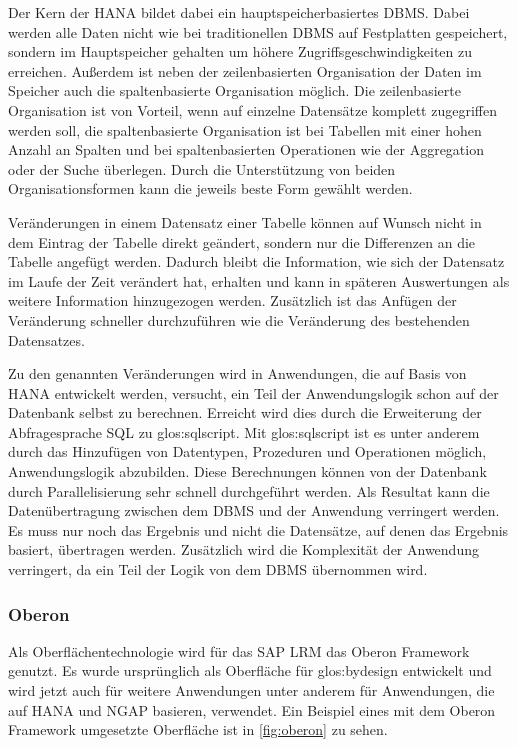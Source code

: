 \begin{onehalfspacing}
Der Kern der \gls{HANA} bildet dabei ein hauptspeicherbasiertes \gls{DBMS}. Dabei werden alle Daten nicht wie bei traditionellen \gls{DBMS} auf Festplatten gespeichert, sondern im Hauptspeicher gehalten um höhere Zugriffsgeschwindigkeiten zu erreichen. Außerdem ist neben der zeilenbasierten Organisation der Daten im Speicher auch die spaltenbasierte Organisation möglich. Die zeilenbasierte Organisation ist von Vorteil, wenn auf einzelne Datensätze komplett zugegriffen werden soll, die spaltenbasierte Organisation ist bei Tabellen mit einer hohen Anzahl an Spalten und bei spaltenbasierten Operationen wie der Aggregation oder der Suche überlegen. Durch die Unterstützung von beiden Organisationsformen kann die jeweils beste Form gewählt werden.


Veränderungen in einem Datensatz einer Tabelle können auf Wunsch nicht in dem Eintrag der Tabelle direkt geändert, sondern nur die Differenzen an die Tabelle angefügt werden. Dadurch bleibt die Information, wie sich der Datensatz im Laufe der Zeit verändert hat, erhalten und kann in späteren Auswertungen als weitere Information hinzugezogen werden. Zusätzlich ist das Anfügen der Veränderung schneller durchzuführen wie die Veränderung des bestehenden Datensatzes.

Zu den genannten Veränderungen wird in Anwendungen, die auf Basis von \gls{HANA} entwickelt werden, versucht, ein Teil der Anwendungslogik schon auf der Datenbank selbst zu berechnen. Erreicht wird dies durch die Erweiterung der Abfragesprache \gls{SQL} zu \gls{glos:sqlscript}. Mit \gls{glos:sqlscript} ist es unter anderem durch das Hinzufügen von Datentypen, Prozeduren und Operationen möglich, Anwendungslogik abzubilden. Diese Berechnungen können von der Datenbank durch Parallelisierung sehr schnell durchgeführt werden. Als Resultat kann die Datenübertragung zwischen dem \gls{DBMS} und der Anwendung verringert werden. Es muss nur noch das Ergebnis und nicht die Datensätze, auf denen das Ergebnis basiert, übertragen werden. Zusätzlich wird die Komplexität der Anwendung verringert, da ein Teil der Logik von dem \gls{DBMS} übernommen wird.

\subsubsection{Oberon}
Als Oberflächentechnologie wird für das SAP LRM das Oberon Framework genutzt. Es wurde ursprünglich als Oberfläche für \gls{glos:bydesign} entwickelt und wird jetzt auch für weitere Anwendungen unter anderem für Anwendungen, die auf HANA und NGAP basieren, verwendet. Ein Beispiel eines mit dem Oberon Framework umgesetzte Oberfläche ist in \vref{fig:oberon} zu sehen.


\end{onehalfspacing}
